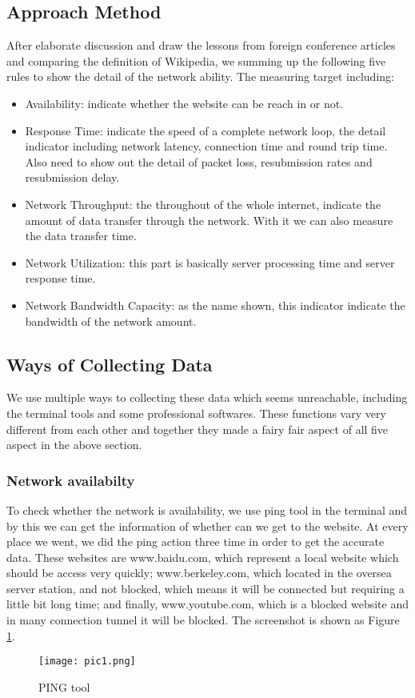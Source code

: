 \documentclass[paper=a4, fontsize=11pt]{scrartcl}
\numberwithin{equation}{section}
\numberwithin{figure}{section}
\numberwithin{table}{section}
\begin{document}
\subsection{Approach Method}
After elaborate discussion and draw the lessons from foreign conference articles \cite{cn1} \cite{cn2} and comparing the definition of Wikipedia, we summing up the following five rules to show the detail of the network ability. The measuring target including:
\begin{itemize}
\item Availability: indicate whether the website can be reach in or not.
\item Response Time: indicate the speed of a complete network loop, the detail indicator including network latency, connection time and round trip time. Also need to show out the detail of packet loss, resubmission rates and resubmission delay.
\item Network Throughput: the throughout of the whole internet, indicate the amount of data transfer through the network. With it we can also measure the data transfer time.
\item Network Utilization: this part is basically server processing time and server response time.
\item Network Bandwidth Capacity: as the name shown, this indicator indicate the bandwidth of the network amount.
\end{itemize}
\subsection{Ways of Collecting Data}
We use multiple ways to collecting these data which seems unreachable, including the terminal tools and some professional softwares. These functions vary very different from each other and together they made a fairy fair aspect of all five aspect in the above section.
\subsubsection{Network availabilty}
To check whether the network is availability, we use ping tool in the terminal and by this we can get the information of whether can we get to the website. At every place we went, we did the ping action three time in order to get the accurate data. These websites are www.baidu.com, which represent a local website which should be access very quickly; www.berkeley.com, which located in the oversea server station, and not blocked, which means it will be connected but requiring a little bit long time; and finally, www.youtube.com, which is a blocked website and in many connection tunnel it will be blocked. The screenshot is shown as Figure \ref{fig1}.
\begin{figure}[!htb]
\centering
\texttt{[image: pic1.png]}
\caption{PING tool}
\label{fig1}
\end{figure}
\end{document}
